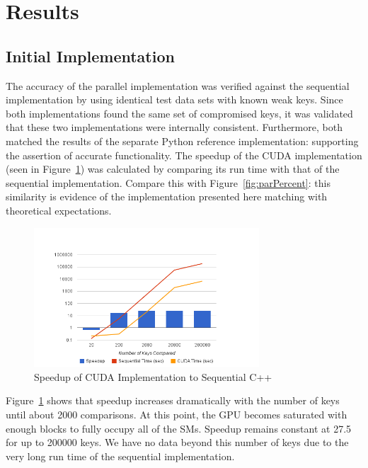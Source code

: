 \documentclass[smallextended]{svjour3}       %
\begin{document}
\section{Results}
\label{sec:results}

\subsection{Initial Implementation}
\label{subsec:initimpl}
The accuracy of the parallel implementation was verified against the 
sequential implementation by using identical test data sets with known 
weak keys. Since both implementations found the same set of compromised keys,
it was validated that these two implementations 
were internally consistent. Furthermore, both matched the results of the 
separate Python reference implementation: supporting the assertion of accurate 
functionality. The speedup of the CUDA implementation (seen in
Figure~\ref{fig:speedup}) was calculated by comparing its run time with that
of the sequential implementation. Compare this with Figure~\ref{fig:parPercent}:
this similarity is evidence of the implementation presented here matching
with theoretical expectations.

\begin{figure}
   \centering
   \includegraphics[width=0.75\textwidth]{chart_1}
   \caption{Speedup of CUDA Implementation to Sequential C++}
   \label{fig:speedup}
\end{figure}

Figure~\ref{fig:speedup} shows that speedup increases dramatically with 
the number of keys until about 2000 comparisons. At this point, the GPU
becomes saturated with enough blocks to fully occupy all of the SMs. Speedup
remains constant at 27.5 for up to 200000 keys. We have no data beyond this
number of keys due to the very long run time of the sequential implementation. 
\end{document}
